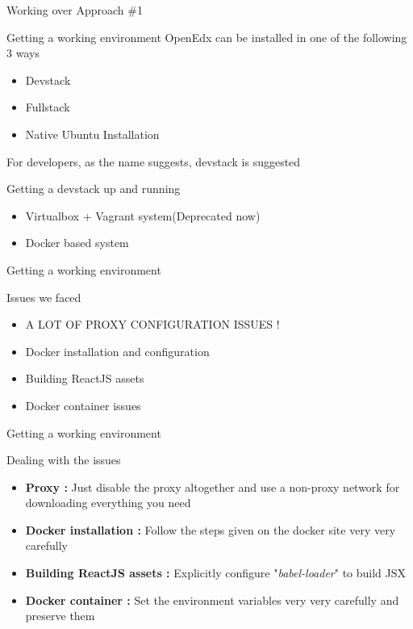 \documentclass{beamer}
\begin{document}
	\begin{frame}{Working over Approach \#1}
		\begin{block}{Getting a working environment}
			OpenEdx can be installed in one of the following 3 ways
			\begin{itemize}
				\item Devstack
				\item Fullstack
				\item Native Ubuntu Installation
			\end{itemize}
			For developers, as the name suggests, devstack is suggested
		\end{block}
		\begin{block}{Getting a devstack up and running}
			\begin{itemize}
				\item Virtualbox + Vagrant system(Deprecated now)
				\item Docker based system
			\end{itemize}		
		\end{block}
	\end{frame}
	
	\begin{frame}{Getting a working environment}
		\begin{block}{Issues we faced}
			\begin{itemize}
				\item \alert{A LOT OF PROXY CONFIGURATION ISSUES !}
				\item Docker installation and configuration
				\item Building ReactJS assets
				\item Docker container issues
			\end{itemize}
		\end{block}
	\end{frame}
	
	\begin{frame}{Getting a working environment}
		\begin{block}{Dealing with the issues }
			\begin{itemize}
				\item \textbf{Proxy :} Just disable the proxy altogether and use a non-proxy network for downloading everything you need \pause
				\item \textbf{Docker installation : } Follow the steps given on the docker site very very carefully \pause
				\item \textbf{Building ReactJS assets : } Explicitly configure "\textit{babel-loader}" to build JSX \pause
				\item \textbf{Docker container : } Set the environment variables very very carefully and preserve them 
			\end{itemize}
		\end{block}
	\end{frame}
	
\end{document}
